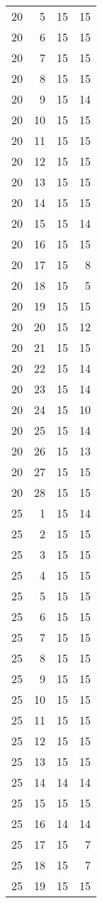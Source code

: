 \documentclass[
]{article}
\begin{document}
\begin{longtable}[]{@{}rrrr@{}}
20 & 5 & 15 & 15 \\
20 & 6 & 15 & 15 \\
20 & 7 & 15 & 15 \\
20 & 8 & 15 & 15 \\
20 & 9 & 15 & 14 \\
20 & 10 & 15 & 15 \\
20 & 11 & 15 & 15 \\
20 & 12 & 15 & 15 \\
20 & 13 & 15 & 15 \\
20 & 14 & 15 & 15 \\
20 & 15 & 15 & 14 \\
20 & 16 & 15 & 15 \\
20 & 17 & 15 & 8 \\
20 & 18 & 15 & 5 \\
20 & 19 & 15 & 15 \\
20 & 20 & 15 & 12 \\
20 & 21 & 15 & 15 \\
20 & 22 & 15 & 14 \\
20 & 23 & 15 & 14 \\
20 & 24 & 15 & 10 \\
20 & 25 & 15 & 14 \\
20 & 26 & 15 & 13 \\
20 & 27 & 15 & 15 \\
20 & 28 & 15 & 15 \\
25 & 1 & 15 & 14 \\
25 & 2 & 15 & 15 \\
25 & 3 & 15 & 15 \\
25 & 4 & 15 & 15 \\
25 & 5 & 15 & 15 \\
25 & 6 & 15 & 15 \\
25 & 7 & 15 & 15 \\
25 & 8 & 15 & 15 \\
25 & 9 & 15 & 15 \\
25 & 10 & 15 & 15 \\
25 & 11 & 15 & 15 \\
25 & 12 & 15 & 15 \\
25 & 13 & 15 & 15 \\
25 & 14 & 14 & 14 \\
25 & 15 & 15 & 15 \\
25 & 16 & 14 & 14 \\
25 & 17 & 15 & 7 \\
25 & 18 & 15 & 7 \\
25 & 19 & 15 & 15 \\

\end{longtable}
\end{document}
